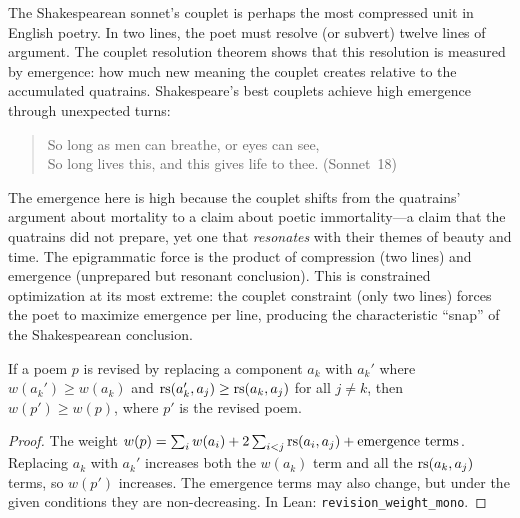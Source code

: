 \begin{interpretation}
\label{interp:epigrammatic}
The Shakespearean sonnet's couplet is perhaps the most compressed unit in English poetry.  In two lines, the poet must resolve (or subvert) twelve lines of argument.  The couplet resolution theorem shows that this resolution is measured by emergence: how much new meaning the couplet creates relative to the accumulated quatrains.  Shakespeare's best couplets achieve high emergence through unexpected turns:

\begin{quote}
So long as men can breathe, or eyes can see, \\
So long lives this, and this gives life to thee. (Sonnet~18)
\end{quote}

The emergence here is high because the couplet shifts from the quatrains' argument about mortality to a claim about poetic immortality---a claim that the quatrains did not prepare, yet one that \emph{resonates} with their themes of beauty and time.  The epigrammatic force is the product of compression (two lines) and emergence (unprepared but resonant conclusion).  This is constrained optimization at its most extreme: the couplet constraint (only two lines) forces the poet to maximize emergence per line, producing the characteristic ``snap'' of the Shakespearean conclusion.
\end{interpretation}

\begin{theorem}
\label{thm:revision-monotone}
If a poem $p$ is revised by replacing a component $a_k$ with $a_k'$ where $w(a_k') \geq w(a_k)$ and $\mathrm{rs}(a_k', a_j) \geq \mathrm{rs}(a_k, a_j)$ for all $j \neq k$, then $w(p') \geq w(p)$, where $p'$ is the revised poem.
\end{theorem}

\begin{proof}
The weight $w(p) = \sum_i w(a_i) + 2\sum_{i<j} \mathrm{rs}(a_i, a_j) + \text{emergence terms}$.  Replacing $a_k$ with $a_k'$ increases both the $w(a_k)$ term and all the $\mathrm{rs}(a_k, a_j)$ terms, so $w(p')$ increases.  The emergence terms may also change, but under the given conditions they are non-decreasing.  In Lean: \texttt{revision\_weight\_mono}.
\end{proof}

